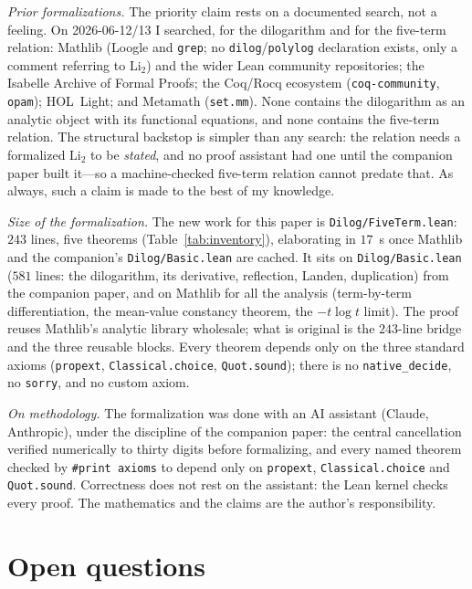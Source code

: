 \documentclass[11pt]{article}
\newcommand{\lean}[1]{\texttt{#1}}
\newcommand{\Li}{\mathrm{Li}_2}
\begin{document}
\emph{Prior formalizations.} The priority claim rests on a documented search, not a feeling.
On 2026-06-12/13 I searched, for the dilogarithm and for the five-term relation: Mathlib
(Loogle and \lean{grep}; no \lean{dilog}/\lean{polylog} declaration exists, only a comment
referring to $\Li$) and the wider Lean community repositories; the Isabelle Archive of Formal
Proofs; the Coq/Rocq ecosystem (\texttt{coq-community}, \texttt{opam}); HOL~Light; and
Metamath (\texttt{set.mm}). None contains the dilogarithm as an analytic object with its
functional equations, and none contains the five-term relation. The structural backstop is
simpler than any search: the relation needs a formalized $\Li$ to be \emph{stated}, and no
proof assistant had one until the companion paper built it---so a machine-checked five-term
relation cannot predate that. As always, such a claim is made to the best of my knowledge.

\emph{Size of the formalization.} The new work for this paper is \lean{Dilog/FiveTerm.lean}:
$243$ lines, five theorems (Table~\ref{tab:inventory}), elaborating in $17$~s once Mathlib and
the companion's \lean{Dilog/Basic.lean} are cached. It sits on \lean{Dilog/Basic.lean}
($581$ lines: the dilogarithm, its derivative, reflection, Landen, duplication) from the
companion paper, and on Mathlib for all the analysis (term-by-term differentiation, the
mean-value constancy theorem, the $-t\log t$ limit). The proof reuses Mathlib's analytic
library wholesale; what is original is the $243$-line bridge and the three reusable blocks.
Every theorem depends only on the three standard axioms (\lean{propext},
\lean{Classical.choice}, \lean{Quot.sound}); there is no \lean{native\_decide}, no
\lean{sorry}, and no custom axiom.

\emph{On methodology.} The formalization was done with an AI assistant (Claude, Anthropic),
under the discipline of the companion paper: the central cancellation verified numerically
to thirty digits before formalizing, and every named theorem checked by \lean{\#print
axioms} to depend only on \lean{propext}, \lean{Classical.choice} and \lean{Quot.sound}.
Correctness does not rest on the assistant: the Lean kernel checks every proof. The
mathematics and the claims are the author's responsibility.

\section{Open questions}\label{sec:questions}
\end{document}

